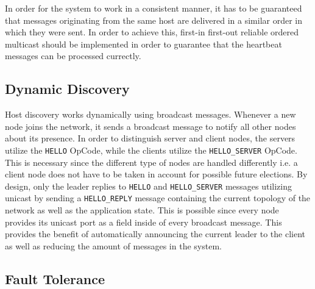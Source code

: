\documentclass[runningheads]{llncs}
\begin{document}
In order for the system to work in a consistent manner, it has to be guaranteed
that messages originating from the same host are delivered in a similar order
in which they were sent. In order to achieve this, first-in first-out reliable
ordered multicast should be implemented in order to guarantee that the heartbeat
messages can be processed currectly.

\subsection{Dynamic Discovery}

Host discovery works dynamically using broadcast messages.
Whenever a new node joins the network, it sends a broadcast message to notify
all other nodes about its presence.
\newline
\newline
In order to distinguish server and client
nodes, the servers utilize the \texttt{HELLO} OpCode, while the clients utilize the
\texttt{HELLO\_SERVER} OpCode. This is necessary since the different type of nodes are
handled differently i.e. a client node does not have to be taken in account for
possible future elections. By design, only the leader replies to \texttt{HELLO} and
\texttt{HELLO\_SERVER} messages utilizing unicast by sending a \texttt{HELLO\_REPLY} message
containing the current topology of the network as well as the application
state. This is possible since every node provides its unicast port as a field
inside of every broadcast message. This provides the benefit of automatically
announcing the current leader to the client as well as reducing the amount of
messages in the system.

\subsection{Fault Tolerance}
\end{document}

